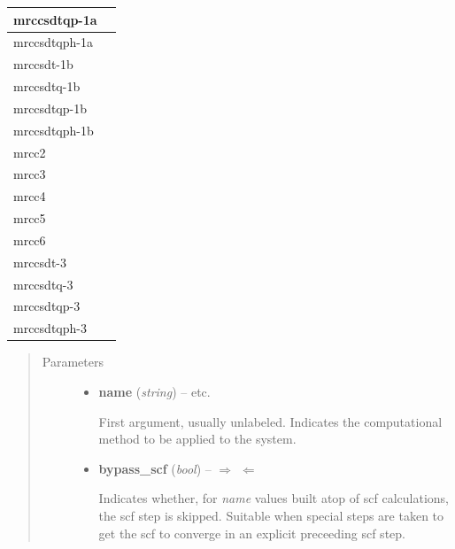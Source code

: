 \documentclass[letterpaper,10pt,english]{sphinxmanual}
\begin{document}
\begin{fulllineitems}
\begin{longtable}{|l|l|}
mrccsdtqp-1a
 & \\\hline

mrccsdtqph-1a
 & \\\hline

mrccsdt-1b
 & \\\hline

mrccsdtq-1b
 & \\\hline

mrccsdtqp-1b
 & \\\hline

mrccsdtqph-1b
 & \\\hline

mrcc2
 & \\\hline

mrcc3
 & \\\hline

mrcc4
 & \\\hline

mrcc5
 & \\\hline

mrcc6
 & \\\hline

mrccsdt-3
 & \\\hline

mrccsdtq-3
 & \\\hline

mrccsdtqp-3
 & \\\hline

mrccsdtqph-3
 & \\\hline
\end{longtable}

\begin{quote}\begin{description}
\item[{Parameters}] \leavevmode\begin{itemize}
\item {} 
\textbf{name} (\emph{string}) -- 
 \textbar{}\textbar{}  \textbar{}\textbar{}  \textbar{}\textbar{} etc.

First argument, usually unlabeled. Indicates the computational method
to be applied to the system.


\item {} 
\textbf{bypass\_scf} (\emph{bool}) -- 
 \textbar{}\textbar{} $\Rightarrow$  $\Leftarrow$

Indicates whether, for \emph{name} values built atop of scf calculations,
the scf step is skipped. Suitable when special steps are taken to get
the scf to converge in an explicit preceeding scf step.



\end{itemize}
\end{description}
\end{quote}
\end{fulllineitems}
\end{document}
